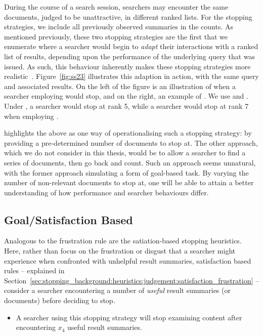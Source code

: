 During the course of a search session, searchers may encounter the same documents, judged to be unattractive, in different ranked lists. For the stopping strategies, we include all previously observed summaries in the counts. As mentioned previously, these two stopping strategies are the first that we enumerate where a searcher would begin to \emph{adapt} their interactions with a ranked list of results, depending upon the performance of the underlying query that was issued. As such, this behaviour inherently makes these stopping strategies more realistic~\cite{moffat2013users_versus_models}. Figure~\ref{fig:ss23} illustrates this adaption in action, with the same query and associated results. On the left of the figure is an illustration of when a searcher employing  would stop, and on the right, an example of . We use  and . Under , a searcher would stop at rank 5, while a searcher would stop at rank 7 when employing .

\cite{cooper1973retrieval_effectiveness_ii} highlights the above as one way of operationalising such a stopping strategy: by providing a pre-determined number of documents to stop at. The other approach, which we do not consider in this thesis, would be to allow a searcher to find a series of documents, then go back and count. Such an approach seems unnatural, with the former approach simulating a form of goal-based task. By varying the number of non-relevant documents to stop at, one will be able to attain a better understanding of how performance and searcher behaviours differ.

\subsection{Goal/Satisfaction Based}
Analogous to the frustration rule are the satiation-based stopping heuristics. Here, rather than focus on the frustration or disgust that a searcher might experience when confronted with unhelpful result summaries, satisfaction based rules -- explained in Section~\ref{sec:stopping_background:heuristics:judgement:satisfaction_frustration} -- consider a searcher encountering a number of \emph{useful} result summaries (or documents) before deciding to stop.

\begin{itemize}
    \item[\blueboxbold{SS4}] A searcher using this stopping strategy will stop examining content after encountering $x_4$ useful result summaries.
\end{itemize}

